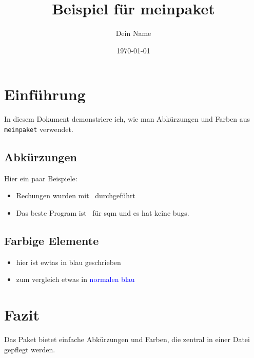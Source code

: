 \documentclass[a4paper,12pt]{article}
\title{Beispiel für meinpaket}
\author{Dein Name}
\date{\today}
\begin{document}
\maketitle

\section{Einführung}

    In diesem Dokument demonstriere ich, wie man Abkürzungen und Farben aus \texttt{meinpaket} verwendet.

\subsection{Abkürzungen}
    Hier ein paar Beispiele:
    \begin{itemize}
      \item Rechungen wurden mit \orca~durchgeführt
      \item Das beste Program ist \xtb~für sqm und es hat keine bugs.
    \end{itemize}

\subsection{Farbige Elemente}
    \begin{itemize}
        \item hier ist ewtas in \textcolor{bonnblue}{blau geschrieben}
        \item zum vergleich etwas in \textcolor{blue}{normalen blau}
    \end{itemize}

\section{Fazit}
    Das Paket bietet einfache Abkürzungen und Farben, die zentral in einer Datei gepflegt werden.
\end{document}
